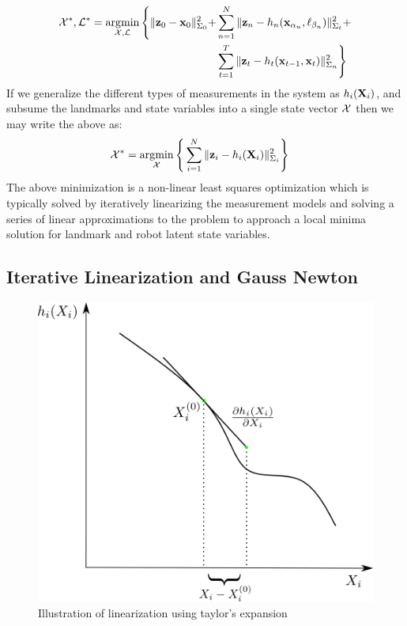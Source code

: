 \begin{align*}
    \mathcal{X}^*, \mathcal{L}^* = \operatorname*{\arg\!\min}_{\mathcal{X}, \mathcal{L}} \Bigg \{ \| \mathbf{z}_0 - \mathbf{x}_0 \|_{\Sigma_0}^2 + &\sum_{n=1}^{N} \| \mathbf{z}_n - h_n(\mathbf{x}_{\alpha_n}, \ell_{\beta_n}) \|_{\Sigma_t}^2 + \\&\sum_{t=1}^{T}\| \mathbf{z}_t - h_t(\mathbf{x}_{t-1}, \mathbf{x}_{t}) \|_{\Sigma_n}^2 \Bigg \}
\end{align*}
If we generalize the different types of measurements in the system as $h_i(\mathbf{X}_i)$, and subsume the landmarks and state variables into a single state vector $\mathcal{X}$ then we may write the above as:
\begin{align}
    \mathcal{X}^* = \operatorname*{\arg\!\min}_{\mathcal{X}} \Bigg \{ &\sum_{i=1}^{N} \| \mathbf{z}_i - h_i(\mathbf{X}_i) \|_{\Sigma_i}^2 \Bigg \} \label{eq:2.3}
\end{align}
The above minimization is a non-linear least squares optimization which is typically solved by iteratively linearizing the measurement models and solving a series of linear approximations to the problem to approach a local minima solution for landmark and robot latent state variables.

\subsection{Iterative Linearization and Gauss Newton}

\begin{figure}[htpb]
    \centering
    \includegraphics[width=0.4\linewidth]{figs/linearization}
    \caption{Illustration of linearization using taylor's expansion}
    \label{fig:taylor}
\end{figure}


